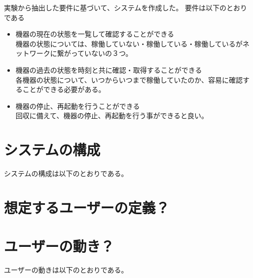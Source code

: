 実験から抽出した要件に基づいて、システムを作成した。
要件は以下のとおりである
\begin{itemize}
	\item 機器の現在の状態を一覧して確認することができる\\
		機器の状態については、稼働していない・稼働している・稼働しているがネットワークに繋がっていないの３つ。
	\item 機器の過去の状態を時刻と共に確認・取得することができる\\
		各機器の状態について、いつからいつまで稼働していたのか、容易に確認することができる必要がある。
	\item 機器の停止、再起動を行うことができる\\
		回収に備えて、機器の停止、再起動を行う事ができると良い。
\end{itemize}

\section{システムの構成}
システムの構成は以下のとおりである。

\section{想定するユーザーの定義？}

\section{ユーザーの動き？}
ユーザーの動きは以下のとおりである。









